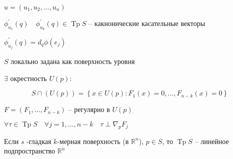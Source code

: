 \documentclass{book}
\newcommand\R{\ensuremath{\mathbb{R}}}
\newcommand{\p}[1]{#1^{\prime}}
\theoremstyle{definition}
\DeclareMathOperator{\Tp}{Tp}
\begin{document}
$u = \left( u_1, u_2, \ldots, u_n \right) $

$\p \phi_{u_1}(q)\quad \p \phi_{u_k}(q)\in \Tp S$ -- какнонические касательные векторы

$\p \phi_{u_j}(q) = d_q\phi(e_j)$

 $S$ локально задана как поверхность уровня

 $\exists $ окрестность $U(p):$

 \[S\cap \left( U(p) \right)  = \left\{ x\in U(p): F_1(x) =0, \ldots, F_{n-k}(x) = 0 \right\} \] 

 $F = \left( F_1, \ldots, F_{n-k} \right) $ -- регулярно в $U(p)$

  $\forall \tau\in \Tp S\quad \forall j=1, \ldots, n-k\quad \tau \perp \nabla _p F_j$

  \begin{statement}
      Если $s$ -гладкая  $k$-мерная поверхность (в $\R^n$), $p\in S$, то  $\Tp S$ -- линейное подпространство  $\R^n$
  \end{statement}
\end{document}
